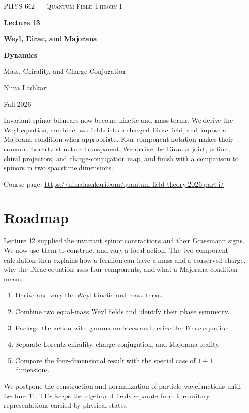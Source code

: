 \documentclass[11pt]{article}
\begin{document}
\begin{titlepage}
\centering
\vspace*{1.2in}
{\scshape\Large PHYS 662 --- Quantum Field Theory I\par}
\vspace{0.35in}
{\Huge\bfseries\color{qftblue} Lecture 13\par}
\vspace{0.15in}
{\LARGE\bfseries Weyl, Dirac, and Majorana\par}
\vspace{0.06in}
{\LARGE\bfseries Dynamics\par}
\vspace{0.16in}
{\large\color{qftgreen} Mass, Chirality, and Charge Conjugation\par}
\vspace{0.6in}
{\large Nima Lashkari\par}
{\large Fall 2026\par}
\vfill
\begin{minipage}{0.86\textwidth}\small
Invariant spinor bilinears now become kinetic and mass terms.
We derive the Weyl equation, combine two fields into a charged Dirac
field, and impose a Majorana condition when appropriate. Four-component notation makes their common
Lorentz structure transparent. We derive the Dirac adjoint, action,
chiral projectors, and charge-conjugation map, and finish with a
comparison to spinors in two spacetime dimensions.

\medskip
Course page: \url{https://nimalashkari.com/quantum-field-theory-2026-part-i/}
\end{minipage}
\vspace{0.5in}
\end{titlepage}
\begingroup\small\tableofcontents\endgroup
\newpage
{}

\section*{Roadmap}
Lecture 12 supplied the invariant spinor contractions and their
Grassmann signs. We now use them to construct and vary a local action.
The two-component calculation then explains how a fermion can have
a mass and a conserved charge, why the Dirac equation uses four
components, and what a Majorana condition means.
\begin{enumerate}
\item Derive and vary the Weyl kinetic and mass terms.
\item Combine two equal-mass Weyl fields and identify their phase symmetry.
\item Package the action with gamma matrices and derive the Dirac equation.
\item Separate Lorentz chirality, charge conjugation, and Majorana reality.
\item Compare the four-dimensional result with the special case of \(1+1\) dimensions.
\end{enumerate}
We postpone the construction and normalization of particle wavefunctions
until Lecture 14. This keeps the algebra of fields separate from the
unitary representations carried by physical states.
\end{document}

